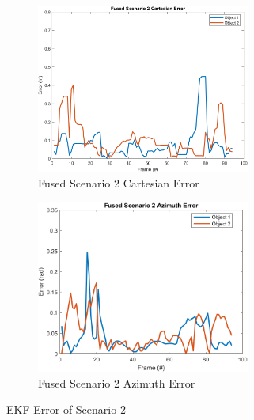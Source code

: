 \begin{figure}[!htb]
    \hspace{0.1\textwidth}
    \begin{subfigure}[b]{0.3\textwidth}%
        \includegraphics[width=7cm]{Figures/matlab/Fused Scenario 2 Cartesian Error.png}
        \caption{Fused Scenario 2 Cartesian Error}
        \label{subfig:err_cart_2}
    \end{subfigure}
    \hspace{0.15\textwidth}
    \begin{subfigure}[b]{0.3\textwidth}%
        \includegraphics[width=7cm]{Figures/matlab/Fused Scenario 2 Azimuth Error.png}
        \caption{Fused Scenario 2 Azimuth Error}
        \label{subfig:err_azi2}
    \end{subfigure}

    \caption{EKF Error of Scenario 2}
    \label{fig:error_2}
\end{figure}
\newpage 
